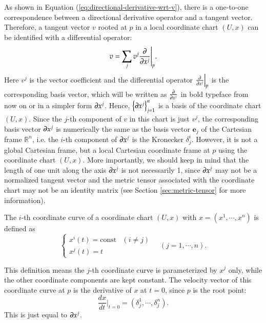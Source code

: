 \documentclass[11pt, a4paper]{book}
\begin{document}
As shown in Equation (\ref{eq:directional-derivative-wrt-v}), there is a one-to-one
correspondence between a directional derivative operator and a tangent vector. Therefore,
a tangent vector $v$ rooted at $p$ in a local coordinate chart $(U,x)$ can be
identified with a differential operator:
\begin{equation}
  \label{eq:tangent-vector-as-diff-op}
  v=\sum_j v^j \frac{\partial}{\partial x^j}\Bigg\vert_p.
\end{equation}
Here $v^j$ is the vector coefficient and the differential operator
$\frac{\partial }{\partial x^j}\Big\vert_p$ is the corresponding basis vector, which will be
written as $\frac{\boldsymbol{\partial}}{\boldsymbol{\partial} x^j}$ in bold typeface from now on or in a
simpler form $\boldsymbol{\partial} x^j$. Hence, $\left\{ \boldsymbol{\partial} x^j \right\}_{j=1}^n$ is a
basis of the coordinate chart $(U,x)$. Since the $j$-th component of $v$ in this chart is
just $v^j$, the corresponding basis vector $\boldsymbol{\partial} x^j$ is numerically the same as
the basis vector $\boldsymbol{e}_j$ of the Cartesian frame $\mathbb{R}^n$, i.e. the $i$-th
component of $\boldsymbol{\partial}x^j$ is the Kronecker $\delta_j^i$. However, it is not a global
Cartesian frame, but a local Cartesian coordinate frame at $p$ using the coordinate chart
$(U,x)$. More importantly, we should keep in mind that the length of one unit along the
axis $\boldsymbol{\partial}x^j$ is not necessarily 1, since $\boldsymbol{\partial}x^j$ may not be a
normalized tangent vector and the metric tensor associated with the coordinate chart may
not be an identity matrix (see Section \ref{sec:metric-tensor} for more information).

\begin{Definition}
  The $i$-th coordinate curve of a coordinate chart $(U,x)$ with $x=(x^1,\cdots,x^n)$ is
  defined as
  \begin{equation}
    \label{eq:coordinate-curves}
    \begin{cases}
      x^i(t)=\text{const} & (i\neq j) \\
      x^j(t)=t
    \end{cases}
    \quad (j=1,\cdots,n).
  \end{equation}
\end{Definition}
This definition means the $j$-th coordinate curve is parameterized by $x^j$ only, while
the other coordinate components are kept constant. The velocity vector of this coordinate
curve at $p$ is the derivative of $x$ at $t=0$, since $p$ is the root point:
\begin{equation}
  \label{eq:tangent-vector-of-coordinate-curve}
  \frac{dx}{dt}\Bigg\vert_{t=0}=(\delta_{j}^1, \cdots, \delta_j^n).
\end{equation}
This is just equal to $\boldsymbol{\partial}x^j$.
\end{document}
